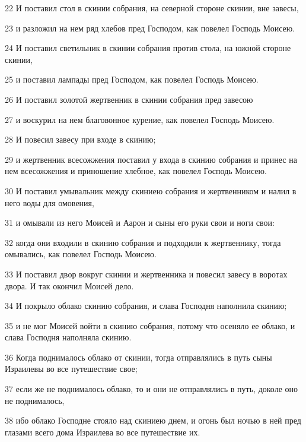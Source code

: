 \par 22 И поставил стол в скинии собрания, на северной стороне скинии, вне завесы,
\par 23 и разложил на нем ряд хлебов пред Господом, как повелел Господь Моисею.
\par 24 И поставил светильник в скинии собрания против стола, на южной стороне скинии,
\par 25 и поставил лампады пред Господом, как повелел Господь Моисею.
\par 26 И поставил золотой жертвенник в скинии собрания пред завесою
\par 27 и воскурил на нем благовонное курение, как повелел Господь Моисею.
\par 28 И повесил завесу при входе в скинию;
\par 29 и жертвенник всесожжения поставил у входа в скинию собрания и принес на нем всесожжения и приношение хлебное, как повелел Господь Моисею.
\par 30 И поставил умывальник между скиниею собрания и жертвенником и налил в него воды для омовения,
\par 31 и омывали из него Моисей и Аарон и сыны его руки свои и ноги свои:
\par 32 когда они входили в скинию собрания и подходили к жертвеннику, тогда омывались, как повелел Господь Моисею.
\par 33 И поставил двор вокруг скинии и жертвенника и повесил завесу в воротах двора. И так окончил Моисей дело.
\par 34 И покрыло облако скинию собрания, и слава Господня наполнила скинию;
\par 35 и не мог Моисей войти в скинию собрания, потому что осеняло ее облако, и слава Господня наполняла скинию.
\par 36 Когда поднималось облако от скинии, тогда отправлялись в путь сыны Израилевы во все путешествие свое;
\par 37 если же не поднималось облако, то и они не отправлялись в путь, доколе оно не поднималось,
\par 38 ибо облако Господне стояло над скиниею днем, и огонь был ночью в ней пред глазами всего дома Израилева во все путешествие их.


